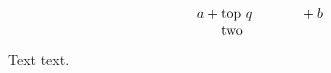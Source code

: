 \documentclass{article}
\begin{document}
\[ a + \parbox[t]{2cm}{top $q$\\ two} + b \]

Text  text.
\end{document}
